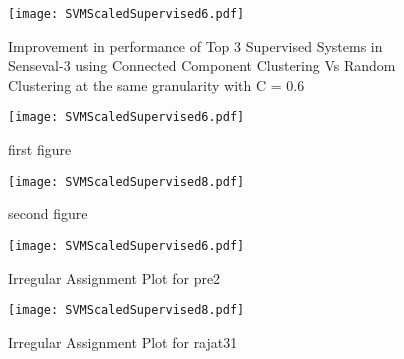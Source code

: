 \begin{figure}[h]
\begin{center}
\texttt{[image: SVMScaledSupervised6.pdf]}
\caption{Improvement in performance of Top 3 Supervised Systems in Senseval-3 using Connected Component Clustering Vs Random Clustering at the same granularity with C = 0.6}
\label{fig:wsdImprovementSupervised0.6}
\end{center}
\end{figure}

\begin{figure}
\centering
\begin{minipage}{0.45\textwidth}
\centering
\texttt{[image: SVMScaledSupervised6.pdf]}
\caption{first figure}
\end{minipage}
\begin{minipage}{0.45\textwidth}
\centering
\texttt{[image: SVMScaledSupervised8.pdf]}
\caption{second figure}
\end{minipage}
\end{figure}

\begin{figure}
\centering
{}
\texttt{[image: SVMScaledSupervised6.pdf]}
\caption{Irregular Assignment Plot for pre2}
\label{img:plot_irreg_assign_pre2}
\endminipage\hfill
\centering
{}
\texttt{[image: SVMScaledSupervised8.pdf]}
\caption{Irregular Assignment Plot for rajat31}
\label{img:plot_irreg_assign_rajat31}
\endminipage\hfill
\vspace{0.3cm}
\end{figure} 